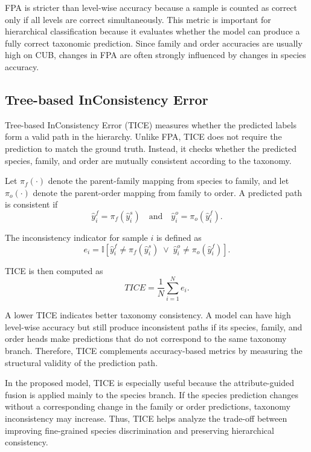 FPA is stricter than level-wise accuracy because a sample is counted as correct only if all levels are correct simultaneously. This metric is important for hierarchical classification because it evaluates whether the model can produce a fully correct taxonomic prediction. Since family and order accuracies are usually high on CUB, changes in FPA are often strongly influenced by changes in species accuracy.

\subsection{Tree-based InConsistency Error}

Tree-based InConsistency Error (TICE) measures whether the predicted labels form a valid path in the hierarchy. Unlike FPA, TICE does not require the prediction to match the ground truth. Instead, it checks whether the predicted species, family, and order are mutually consistent according to the taxonomy.

Let \(\pi_f(\cdot)\) denote the parent-family mapping from species to family, and let \(\pi_o(\cdot)\) denote the parent-order mapping from family to order. A predicted path is consistent if
\begin{equation}
    \hat{y}_i^{f}
    =
    \pi_f(\hat{y}_i^{s})
    \quad \text{and} \quad
    \hat{y}_i^{o}
    =
    \pi_o(\hat{y}_i^{f}).
\end{equation}

The inconsistency indicator for sample \(i\) is defined as
\begin{equation}
    e_i =
    \mathbb{I}
    \left[
        \hat{y}_i^{f}
        \neq
        \pi_f(\hat{y}_i^{s})
        \;\lor\;
        \hat{y}_i^{o}
        \neq
        \pi_o(\hat{y}_i^{f})
    \right].
\end{equation}

TICE is then computed as
\begin{equation}
    TICE =
    \frac{1}{N}
    \sum_{i=1}^{N}
    e_i.
\end{equation}

A lower TICE indicates better taxonomy consistency. A model can have high level-wise accuracy but still produce inconsistent paths if its species, family, and order heads make predictions that do not correspond to the same taxonomy branch. Therefore, TICE complements accuracy-based metrics by measuring the structural validity of the prediction path.

In the proposed model, TICE is especially useful because the attribute-guided fusion is applied mainly to the species branch. If the species prediction changes without a corresponding change in the family or order predictions, taxonomy inconsistency may increase. Thus, TICE helps analyze the trade-off between improving fine-grained species discrimination and preserving hierarchical consistency.

